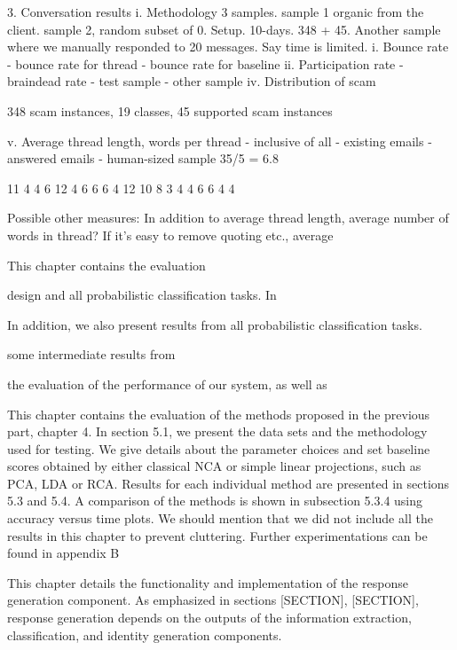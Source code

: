 	3. Conversation results
		i. Methodology 3 samples. sample 1 organic from the client. sample 2, random subset of 
		0. Setup. 10-days. 348 + 45. Another sample where we manually responded to 20 messages. Say time is limited.
		i. Bounce rate
			- bounce rate for thread
			- bounce rate for baseline
		ii. Participation rate
			- braindead rate
			- test sample
			- other sample
		iv. Distribution of scam


348 scam instances, 19 classes, 45 supported scam instances



		v.  Average thread length, words per thread
			- inclusive of all
			- existing emails
			- answered emails
			- human-sized sample 35/5 = 6.8

11
4
4
6
12
4
6
6
6
4
12
10
8
3
4
4
6
6
4
4



Possible other measures: In addition to average thread length, average number of words in thread? If it's easy to remove quoting etc., average %






This chapter contains the evaluation 



design and all probabilistic classification tasks. In 

In addition, we also present results from all probabilistic classification tasks.

some intermediate results from 

the evaluation of the performance of our system, as well as 


This chapter contains the evaluation of the methods proposed in the previous
part, chapter 4. In section 5.1, we present the data sets and the methodology
used for testing. We give details about the parameter choices and set baseline
scores obtained by either classical NCA or simple linear projections, such as PCA,
LDA or RCA. Results for each individual method are presented in sections 5.3
and 5.4. A comparison of the methods is shown in subsection 5.3.4 using accuracy
versus time plots.
We should mention that we did not include all the results in this chapter to
prevent cluttering. Further experimentations can be found in appendix B

This chapter details the functionality and implementation of the response generation component. As emphasized in sections [SECTION], [SECTION], response generation depends on the outputs of the information extraction, classification, and identity generation components. 

